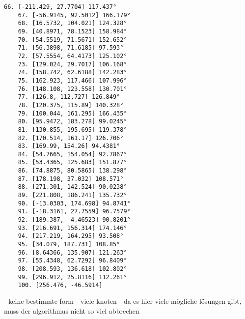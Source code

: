\documentclass[a4paper,10pt,ngerman]{scrartcl}
\begin{document}
\begin{lstlisting}[frame=single, title=Programmausgabe wenigerkrumm7.txt, breaklines=true,label={lst:lstlisting4}]
    66. [-211.429, 27.7704] 117.437°
    67. [-56.9145, 92.5012] 166.179°
    68. [16.5732, 104.021] 124.328°
    69. [40.8971, 78.1523] 158.984°
    70. [54.5519, 71.5671] 152.652°
    71. [56.3898, 71.6185] 97.593°
    72. [57.5554, 64.4173] 125.102°
    73. [129.024, 29.7017] 106.168°
    74. [158.742, 62.6188] 142.283°
    75. [162.923, 117.466] 107.996°
    76. [148.108, 123.558] 130.701°
    77. [126.8, 112.727] 126.849°
    78. [120.375, 115.89] 140.328°
    79. [100.044, 161.295] 166.435°
    80. [95.9472, 183.278] 99.0245°
    81. [130.855, 195.695] 119.378°
    82. [170.514, 161.17] 126.706°
    83. [169.99, 154.26] 94.4381°
    84. [54.7665, 154.054] 92.7867°
    85. [53.4365, 125.683] 151.877°
    86. [74.8875, 80.5865] 138.298°
    87. [178.198, 37.032] 108.571°
    88. [271.301, 142.524] 90.0238°
    89. [221.808, 186.241] 135.732°
    90. [-13.0303, 174.698] 94.8741°
    91. [-18.3161, 27.7559] 96.7579°
    92. [189.387, -4.46523] 90.8201°
    93. [216.691, 156.314] 174.146°
    94. [217.219, 164.295] 93.508°
    95. [34.079, 187.731] 108.85°
    96. [8.64366, 135.907] 121.263°
    97. [55.4348, 62.7292] 96.8409°
    98. [208.593, 136.618] 102.802°
    99. [296.912, 25.8116] 112.261°
    100. [256.476, -46.5914]
    \end{lstlisting}

    - keine bestimmte form
    - viele knoten
    - da es hier viele mögliche lösungen gibt, muss der algorithmus nicht so viel abbrechen
    
    \newpage
\end{document}
